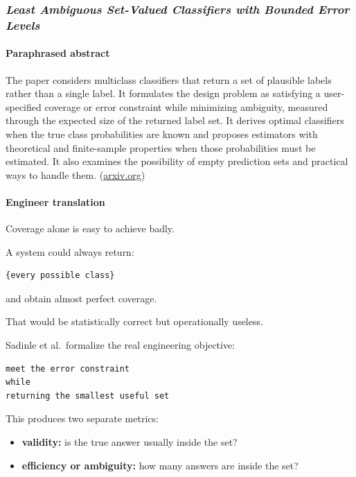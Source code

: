 \subsubsection{\texorpdfstring{\emph{Least Ambiguous Set-Valued Classifiers with Bounded Error Levels}}{Least Ambiguous Set-Valued Classifiers with Bounded Error Levels}}\label{least-ambiguous-set-valued-classifiers-with-bounded-error-levels}

\paragraph{Paraphrased abstract}\label{paraphrased-abstract-2}

The paper considers multiclass classifiers that return a set of plausible labels rather than a single label. It formulates the design problem as satisfying a user-specified coverage or error constraint while minimizing ambiguity, measured through the expected size of the returned label set. It derives optimal classifiers when the true class probabilities are known and proposes estimators with theoretical and finite-sample properties when those probabilities must be estimated. It also examines the possibility of empty prediction sets and practical ways to handle them. (\href{https://arxiv.org/abs/1609.00451?utm_source=chatgpt.com}{arxiv.org})

\paragraph{Engineer translation}\label{engineer-translation-2}

Coverage alone is easy to achieve badly.

A system could always return:

\begin{lstlisting}
{every possible class}
\end{lstlisting}

and obtain almost perfect coverage.

That would be statistically correct but operationally useless.

Sadinle et al.~formalize the real engineering objective:

\begin{lstlisting}
meet the error constraint
while
returning the smallest useful set
\end{lstlisting}

This produces two separate metrics:

\begin{itemize}
\tightlist
\item
  \textbf{validity:} is the true answer usually inside the set?
\item
  \textbf{efficiency or ambiguity:} how many answers are inside the set?
\end{itemize}

